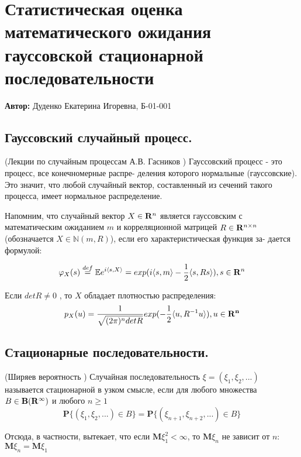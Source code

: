 
\section{Статистическая оценка математического ожидания гауссовской стационарной последовательности}

 \textbf{Автор:} Дуденко Екатерина Игоревна, Б-01-001

\subsection{Гауссовский случайный процесс.}
\begin{definition}(Лекции по случайным процессам А.В. Гасников \cite{GasnikovLectionsRP})
Гауссовский процесс - это процесс, все конечномерные распре-
деления которого нормальные (гауссовские). Это значит, что любой
случайный вектор, составленный из сечений такого процесса, имеет
нормальное распределение.
\end{definition}

Напомним, что случайный вектор $X \in \mathbb{\bf{R}} ^ n$ является гауссовским с
математическим ожиданием $m$ и корреляционной матрицей $R \in \mathbb{\bf{R}} ^{n \times n}$
(обозначается $X \in \mathbb{N}(m, R)$), если его характеристическая функция за-
дается формулой:

\begin{equation*}
    \varphi_X(s)  \stackrel{def}{=} \mathbb{E}e^{i\langle{s,X}\rangle} = exp(i\langle{s,m}\rangle - \frac{1}{2}\langle{s,Rs}\rangle), s \in \mathbb{\bf{R}}^n
\end{equation*}

Если $det R \neq 0$ , то $X$ обладает плотностью распределения:
\begin{equation*}
    p_X(u) = \frac{1}{\sqrt{(2\pi)^n det R}} exp(-\frac{1}{2}\langle{u,R^{-1}u}\rangle), u \in \mathbb{\bf{R}^n}
\end{equation*}

\subsection{Стационарные последовательности.}

\begin{definition}(Ширяев вероятность \cite{ShiryaevVeroyatnost1})
Случайная последовательность $\xi = (\xi_1, \xi_2, ...)$ называется стационарной в узком смысле, если для любого множества $B \in \mathbb{\bf{B}}(\mathbb{\bf{R}}^{\infty})$ и любого $n \geq 1$
\begin{equation}
\mathbf{P}\{(\xi_1, \xi_2, ...) \in B \} = \mathbf{P}\{ (\xi_{n+1}, \xi_{n+2}, ...) \in B \}
\end{equation}
\end{definition}
Отсюда, в частности, вытекает, что если $\mathbf{M}\xi_1^2 < \infty$, то $\mathbf{M}\xi_n$ не зависит от $n$: $\mathbf{M}\xi_n=\mathbf{M}\xi_1$

